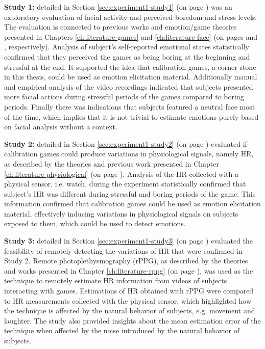 \textbf{Study 1:} detailed in Section \ref{sec:experiment1-study1} (on page \pageref{sec:experiment1-study1}) was an exploratory evaluation of facial activity and perceived boredom and stress levels. The evaluation is connected to previous works and emotion/game theories presented in Chapters \ref{ch:literature-games} and \ref{ch:literature-face} (on pages \pageref{ch:literature-games} and \pageref{ch:literature-face}, respectively). Analysis of subject's self-reported emotional states statistically confirmed that they perceived the games as being boring at the beginning and stressful at the end. It supported the idea that calibration games, a corner stone in this thesis, could be used as emotion elicitation material. Additionally manual and empirical analysis of the video recordings indicated that subjects presented more facial actions during stressful periods of the games compared to boring periods. Finally there was indications that subjects featured a neutral face most of the time, which implies that it is not trivial to estimate emotions purely based on facial analysis without a context.

\textbf{Study 2:} detailed in Section \ref{sec:experiment1-study2} (on page \pageref{sec:experiment1-study2}) evaluated if calibration games could produce variations in physiological signals, namely HR, as described by the theories and previous work presented in Chapter \ref{ch:literature-physiological} (on page \pageref{ch:literature-physiological}). Analysis of the HR collected with a physical sensor, i.e. watch, during the experiment statistically confirmed that subject's HR was different during stressful and boring periods of the game. This information confirmed that calibration games could be used as emotion elicitation material, effectively inducing variations in physiological signals on subjects exposed to them, which could be used to detect emotions.

\textbf{Study 3:} detailed in Section \ref{sec:experiment1-study3} (on page \pageref{sec:experiment1-study3}) evaluated the feasibility of remotely detecting the variations of HR that were confirmed in Study 2. Remote photoplethysmography (rPPG), as described by the theories and works presented in Chapter \ref{ch:literature-rppg} (on page \pageref{ch:literature-rppg}), was used as the technique to remotely estimate HR information from videos of subjects interacting with games. Estimations of HR obtained with rPPG were compared to HR measurements collected with the physical sensor, which highlighted how the technique is affected by the natural behavior of subjects, e.g. movement and laughter. The study also provided insights about the mean estimation error of the technique when affected by the noise introduced by the natural behavior of subjects.

